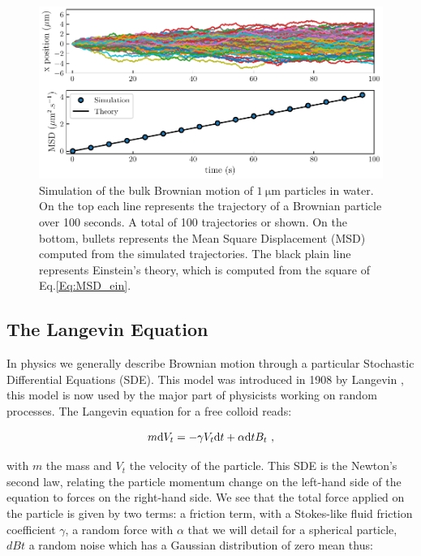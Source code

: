 \begin{figure}[!h]
	\centering
	\includegraphics{02_body/chapter1/image/brown_exemple.pdf}
	\caption{Simulation of the bulk Brownian motion of $1 ~ \mathrm{\mu m}$ particles in water. On the top each line represents the trajectory of a Brownian particle over 100 seconds. A total of 100 trajectories or shown. On the bottom, bullets represents the Mean Square Displacement (\gls{MSD}) computed from the simulated trajectories. The black plain line represents Einstein's theory, which is computed from the square of Eq.\ref{Eq:MSD_ein}.}
	\label{fig:bulkbrown}
\end{figure}

\subsection{The Langevin Equation}

In physics we generally describe Brownian motion through a particular Stochastic Differential Equations (\gls{SDE}). This model was introduced in 1908 by Langevin \cite{langevin_sur_1908}, this model is now used by the major part of physicists working on random processes. The Langevin equation for a free colloid reads:

\begin{equation}
	m \textnormal{d}V_t  = - \gamma V_t \textnormal{d}t + \alpha \textnormal{d}tB_t ~,
	\label{Eq.langevinEquation}
\end{equation}


with $m$ the mass and $V_t$ the velocity of the particle. This \gls{SDE} is the Newton's second law, relating the particle momentum change on the left-hand side of the equation to forces on the right-hand side. We see that the total force applied on the particle is given by two terms: a friction term, with a Stokes-like fluid friction coefficient $\gamma$, a random force with $\alpha$ that we will detail for a spherical particle, $dBt$ a random noise which has a Gaussian distribution of zero mean thus:

